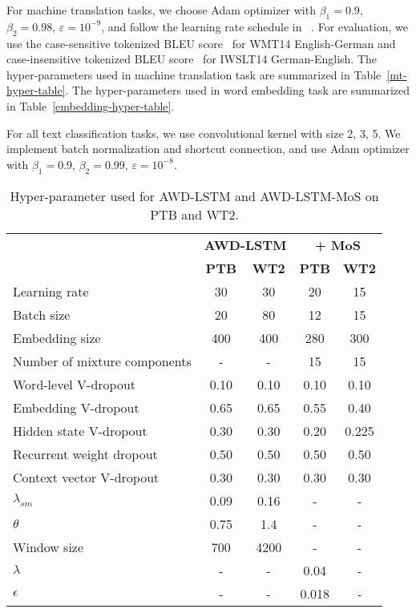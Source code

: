\documentclass{article}
\begin{document}
For machine translation tasks, we choose Adam optimizer with $\beta_{1}= 0.9$, $\beta_{2} = 0.98$, $\varepsilon = 10^{-9}$, and follow the learning rate schedule in ~\cite{vaswani2017attention}. For evaluation, we use the case-sensitive tokenized BLEU score~\cite{papineni2002bleu} for WMT14 English-German and  case-insensitive tokenized BLEU score~\cite{papineni2002bleu} for IWSLT14 German-English. The hyper-parameters used in machine translation task are summarized in Table~\ref{mt-hyper-table}. The hyper-parameters used in word embedding task are summarized in Table~\ref{embedding-hyper-table}.

For all text classification tasks, we use convolutional kernel with size 2, 3, 5. We implement batch normalization and shortcut connection, and use Adam optimizer with $\beta_{1}= 0.9$, $\beta_{2} = 0.99$, $\varepsilon = 10^{-8}$.

\begin{table}[!htbp]
\begin{center}
		\begin{tabular}{l|cc||cc}
			\toprule
             & \multicolumn{2}{c||}{\bf AWD-LSTM} & \multicolumn{2}{c}{\bf + MoS} \\
			 &\bf PTB &\bf WT2&\bf PTB &\bf WT2 \\
            \hline
            Learning rate &30&30&20&15 \\
            Batch size  &20&80&12&15 \\
            Embedding size  &400&400&280&300 \\
Number of mixture components  &-&-&15&15 \\
            \hline
            Word-level V-dropout  &0.10&0.10&0.10&0.10 \\
            Embedding V-dropout  &0.65&0.65&0.55&0.40 \\
            Hidden state V-dropout  &0.30&0.30&0.20&0.225 \\
            Recurrent weight dropout  &0.50&0.50&0.50&0.50 \\
            Context vector V-dropout  &0.30&0.30&0.30&0.30 \\
            \hline
            $\lambda_{sm}$ & 0.09 & 0.16 & - & -\\
            $\theta$ & 0.75 & 1.4 & - & - \\
            Window size & 700 & 4200 & - & - \\
            \hline
            $\lambda$ & - & - & 0.04 & - \\
            $\epsilon$ & - & - & 0.018 & - \\
            \bottomrule
		\end{tabular}
	\end{center}
	\caption{\label{lm-hyper-table} Hyper-parameter used for AWD-LSTM and AWD-LSTM-MoS on PTB and WT2. }
\end{table}
\end{document}
